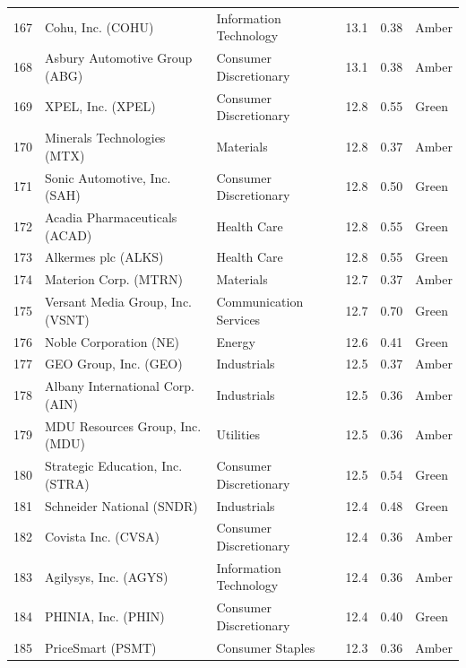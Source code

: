 \documentclass[11pt,a4paper]{article}
\begin{document}
{\begin{longtable}{r p{4.6cm} p{3cm} r r l}
167 & Cohu, Inc. (COHU) & Information Technology & 13.1 & 0.38 & \cellcolor[HTML]{FFEB9C}Amber \\
168 & Asbury Automotive Group (ABG) & Consumer Discretionary & 13.1 & 0.38 & \cellcolor[HTML]{FFEB9C}Amber \\
169 & XPEL, Inc. (XPEL) & Consumer Discretionary & 12.8 & 0.55 & \cellcolor[HTML]{C6EFCE}Green \\
170 & Minerals Technologies (MTX) & Materials & 12.8 & 0.37 & \cellcolor[HTML]{FFEB9C}Amber \\
171 & Sonic Automotive, Inc. (SAH) & Consumer Discretionary & 12.8 & 0.50 & \cellcolor[HTML]{C6EFCE}Green \\
172 & Acadia Pharmaceuticals (ACAD) & Health Care & 12.8 & 0.55 & \cellcolor[HTML]{C6EFCE}Green \\
173 & Alkermes plc (ALKS) & Health Care & 12.8 & 0.55 & \cellcolor[HTML]{C6EFCE}Green \\
174 & Materion Corp. (MTRN) & Materials & 12.7 & 0.37 & \cellcolor[HTML]{FFEB9C}Amber \\
175 & Versant Media Group, Inc. (VSNT) & Communication Services & 12.7 & 0.70 & \cellcolor[HTML]{C6EFCE}Green \\
176 & Noble Corporation (NE) & Energy & 12.6 & 0.41 & \cellcolor[HTML]{C6EFCE}Green \\
177 & GEO Group, Inc. (GEO) & Industrials & 12.5 & 0.37 & \cellcolor[HTML]{FFEB9C}Amber \\
178 & Albany International Corp. (AIN) & Industrials & 12.5 & 0.36 & \cellcolor[HTML]{FFEB9C}Amber \\
179 & MDU Resources Group, Inc. (MDU) & Utilities & 12.5 & 0.36 & \cellcolor[HTML]{FFEB9C}Amber \\
180 & Strategic Education, Inc. (STRA) & Consumer Discretionary & 12.5 & 0.54 & \cellcolor[HTML]{C6EFCE}Green \\
181 & Schneider National (SNDR) & Industrials & 12.4 & 0.48 & \cellcolor[HTML]{C6EFCE}Green \\
182 & Covista Inc. (CVSA) & Consumer Discretionary & 12.4 & 0.36 & \cellcolor[HTML]{FFEB9C}Amber \\
183 & Agilysys, Inc. (AGYS) & Information Technology & 12.4 & 0.36 & \cellcolor[HTML]{FFEB9C}Amber \\
184 & PHINIA, Inc. (PHIN) & Consumer Discretionary & 12.4 & 0.40 & \cellcolor[HTML]{C6EFCE}Green \\
185 & PriceSmart (PSMT) & Consumer Staples & 12.3 & 0.36 & \cellcolor[HTML]{FFEB9C}Amber \\

\end{longtable}}
\end{document}
